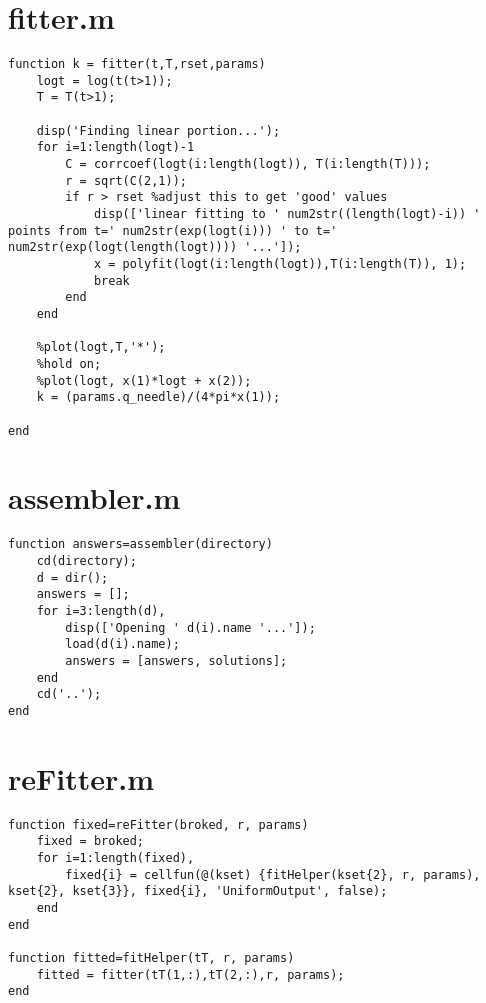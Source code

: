 \section{fitter.m}
\small
\begin{verbatim}
function k = fitter(t,T,rset,params)
    logt = log(t(t>1));
    T = T(t>1);

    disp('Finding linear portion...');    
    for i=1:length(logt)-1
        C = corrcoef(logt(i:length(logt)), T(i:length(T)));
        r = sqrt(C(2,1));
        if r > rset %adjust this to get 'good' values
            disp(['linear fitting to ' num2str((length(logt)-i)) ' points from t=' num2str(exp(logt(i))) ' to t=' num2str(exp(logt(length(logt)))) '...']);
            x = polyfit(logt(i:length(logt)),T(i:length(T)), 1);
            break
        end
    end

    %plot(logt,T,'*');
    %hold on;
    %plot(logt, x(1)*logt + x(2));
    k = (params.q_needle)/(4*pi*x(1));

end
\end{verbatim}
\normalsize

\section{assembler.m}
\small
\begin{verbatim}
function answers=assembler(directory)
    cd(directory);
    d = dir();
    answers = [];
    for i=3:length(d),
        disp(['Opening ' d(i).name '...']);
        load(d(i).name);
        answers = [answers, solutions];
    end
    cd('..');
end
\end{verbatim}
\normalsize

\section{reFitter.m}
\small
\begin{verbatim}
function fixed=reFitter(broked, r, params)
    fixed = broked;
    for i=1:length(fixed),
        fixed{i} = cellfun(@(kset) {fitHelper(kset{2}, r, params), kset{2}, kset{3}}, fixed{i}, 'UniformOutput', false);
    end
end

function fitted=fitHelper(tT, r, params)
    fitted = fitter(tT(1,:),tT(2,:),r, params);
end
\end{verbatim}
\normalsize

